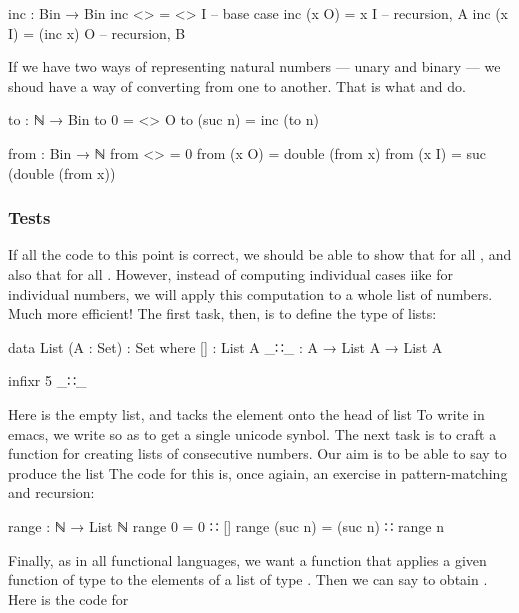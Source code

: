 \begin{colored}[elm]
inc : Bin → Bin
inc <> = <> I          -- base case
inc (x O) = x I        -- recursion, A
inc (x I) = (inc x) O  -- recursion, B
\end{colored}

If we have two ways of representing natural numbers — unary and binary — we shoud have a way of converting from one to another.  That is what  and 
 do.

\begin{colored}[elm]
to : ℕ → Bin
to 0 = <> O
to (suc n) = inc (to n)

from : Bin → ℕ
from <> = 0
from (x O) = double (from x)
from (x I) = suc (double  (from x))
\end{colored}

\subsubsection{Tests}

If all the code to this point is correct, we should be able to show that 
 for all , and also that  for all
. However, instead of computing individual cases iike  for individual numbers, we will apply this computation to a whole list of numbers.  Much more efficient! The first task, then, is to define the type of lists:

\begin{colored}[elm]
data List (A : Set) : Set where
  []  : List A
  _∷_ : A → List A → List A

infixr 5 _∷_
\end{colored}

Here \ccode{[]} is the empty list, and   tacks the element  onto the head of list   To write \ccode{::} in emacs, we write \code{\bs{::}} so as to get a single unicode synbol.  The next task is to craft a function  for creating lists of consecutive numbers.  Our aim is to be able to say  to produce the list  The code for this is, once agiain, an exercise in pattern-matching and recursion:

\begin{colored}[elm]
range : ℕ → List ℕ
range 0 = 0 ∷ []
range (suc n) = (suc n) ∷ range n
\end{colored}

Finally, as in all functional languages, we want a function  that applies a given function of type  to the elements of a list of type .  Then we can say  to obtain . Here is the code for 


